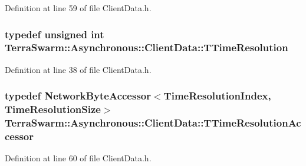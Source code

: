 Definition at line 59 of file Client\-Data.\-h.

\hypertarget{class_terra_swarm_1_1_asynchronous_1_1_client_data_a626a7d114c405bceb24262253fe36c71}{
\subsubsection[{T\-Time\-Resolution}]{\setlength{\rightskip}{0pt plus 5cm}typedef unsigned int {\bf Terra\-Swarm\-::\-Asynchronous\-::\-Client\-Data\-::\-T\-Time\-Resolution}}}\label{class_terra_swarm_1_1_asynchronous_1_1_client_data_a626a7d114c405bceb24262253fe36c71}


Definition at line 38 of file Client\-Data.\-h.

\hypertarget{class_terra_swarm_1_1_asynchronous_1_1_client_data_acda5940545173f5f000e8eb0fdb8c712}{
\subsubsection[{T\-Time\-Resolution\-Accessor}]{\setlength{\rightskip}{0pt plus 5cm}typedef {\bf Network\-Byte\-Accessor}$<${\bf Time\-Resolution\-Index}, {\bf Time\-Resolution\-Size}$>$ {\bf Terra\-Swarm\-::\-Asynchronous\-::\-Client\-Data\-::\-T\-Time\-Resolution\-Accessor}\hspace{0.3cm}{\ttfamily [private]}}}\label{class_terra_swarm_1_1_asynchronous_1_1_client_data_acda5940545173f5f000e8eb0fdb8c712}


Definition at line 60 of file Client\-Data.\-h.



